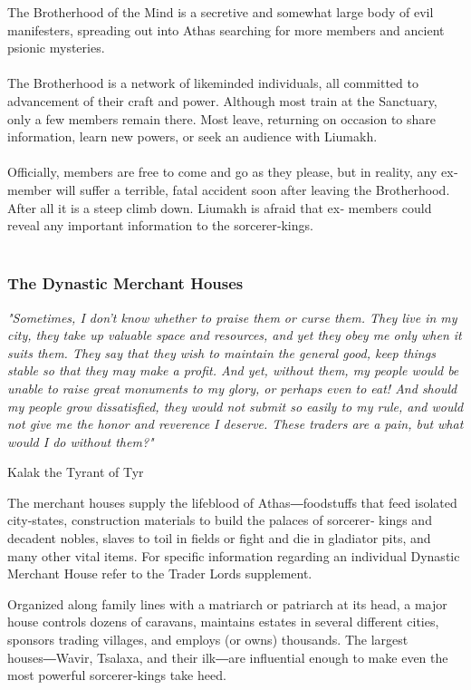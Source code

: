 \begin{multicols}{2}
The Brotherhood of the Mind is a secretive and
somewhat large body of evil manifesters, spreading out
into Athas searching for more members and ancient
psionic mysteries.\\
\\
The Brotherhood is a network of likeminded
individuals, all committed to advancement of their craft
and power. Although most train at the Sanctuary, only a
few members remain there. Most leave, returning on
occasion to share information, learn new powers, or seek
an audience with Liumakh.\\
\\
Officially, members are free to come and go as they
please, but in reality, any ex‐member will suffer a terrible,
fatal accident soon after leaving the Brotherhood. After all
it is a steep climb down. Liumakh is afraid that ex‐
members could reveal any important information to the
sorcerer‐kings.\\
\\

\subsubsection{The Dynastic Merchant Houses}
\epigraph{\textit{
"Sometimes, I don’t know whether to praise them or curse
them. They live in my city, they take up valuable space
and resources, and yet they obey me only when it suits
them. They say that they wish to maintain the general
good, keep things stable so that they may make a profit.
And yet, without them, my people would be unable to raise
great monuments to my glory, or perhaps even to eat! And
should my people grow dissatisfied, they would not submit
so easily to my rule, and would not give me the honor and
reverence I deserve. These traders are a pain, but what
would I do without them?" }}
{ Kalak the Tyrant of Tyr }

The merchant houses supply the lifeblood of
Athas―foodstuffs that feed isolated city‐states,
construction materials to build the palaces of sorcerer‐
kings and decadent nobles, slaves to toil in fields or fight
and die in gladiator pits, and many other vital items.
For specific information regarding an individual
Dynastic Merchant House refer to the Trader Lords
supplement.

Organized along family lines with a matriarch or
patriarch at its head, a major house controls dozens of
caravans, maintains estates in several different cities,
sponsors trading villages, and employs (or owns)
thousands. The largest houses―Wavir, Tsalaxa, and their
ilk―are influential enough to make even the most
powerful sorcerer‐kings take heed.


\end{multicols}
